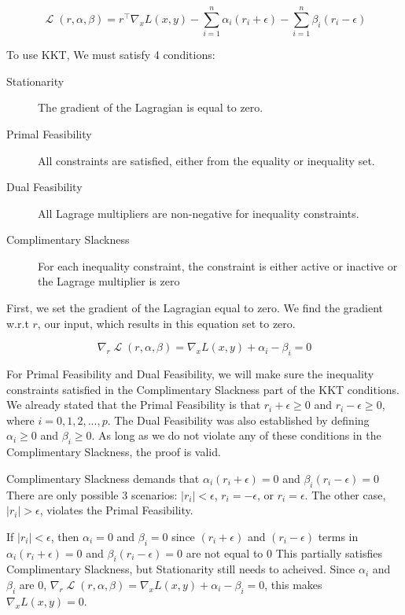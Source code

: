\documentclass{article}
\DeclareMathOperator{\Lagr}{\mathcal{L}}
\begin{document}
\begin{equation}
    \Lagr(r,\alpha, \beta) = r^\intercal \nabla_{x} L(x,y) - \sum_{i=1}^{n} \alpha_{i} (r_{i} + \epsilon) - \sum_{i=1}^{n} \beta_{i} (r_{i} - \epsilon)
\end{equation}

To use KKT, We must satisfy 4 conditions:

\begin{description}
    \item [Stationarity] The gradient of the Lagragian is equal to zero.
    \item [Primal Feasibility] All constraints are satisfied, either from the equality or inequality set.
    \item [Dual Feasibility] All Lagrage multipliers are non-negative for inequality constraints.
    \item [Complimentary Slackness] For each inequality constraint, the constraint is either active or inactive or the Lagrage multiplier is zero
\end{description}

First, we set the gradient of the Lagragian equal to zero.
We find the gradient w.r.t $r$, our input, which results in this equation set to zero.

\begin{equation}
    \nabla_{r}\Lagr(r,\alpha, \beta) = \nabla_{x} L(x,y) + \alpha_{i} - \beta_{i} = 0
\end{equation}

For Primal Feasibility and Dual Feasibility, we will make sure the inequality constraints satisfied in the Complimentary Slackness part of the KKT conditions.
We already stated that the Primal Feasibility is that $ r_{i}+\epsilon \ge 0 $ and $r_{i}-\epsilon \ge 0 $, where $ i = 0, 1, 2, ..., p $.
The Dual Feasibility was also established by defining $ \alpha_{i} \ge 0 $ and $ \beta_{i} \ge 0 $. As long as we do not violate any of these conditions in 
the Complimentary Slackness, the proof is valid.

Complimentary Slackness demands that $\alpha_{i} (r_{i} + \epsilon) = 0$ and $\beta_{i} (r_{i} - \epsilon) = 0$
There are only possible 3 scenarios: $ |r_{i}| < \epsilon$, $r_{i} = -\epsilon$, or $r_{i} = \epsilon$. 
The other case, $ |r_{i}| > \epsilon$, violates the Primal Feasibility.

If $|r_{i}| < \epsilon$, then $\alpha_{i} = 0$ and $\beta_{i} = 0$ 
since $(r_{i} + \epsilon)$ and $(r_{i} - \epsilon)$ terms in $\alpha_{i} (r_{i} + \epsilon) = 0$ and $\beta_{i} (r_{i} - \epsilon) = 0$ are not equal to $0$
This partially satisfies Complimentary Slackness, but Stationarity still needs to acheived. Since $\alpha_{i}$ and $\beta_{i}$ are 0,
$\nabla_{r}\Lagr(r,\alpha, \beta) = \nabla_{x} L(x,y) + \alpha_{i} - \beta_{i} = 0$, this makes $\nabla_{x} L(x,y) = 0$. 
\end{document}
